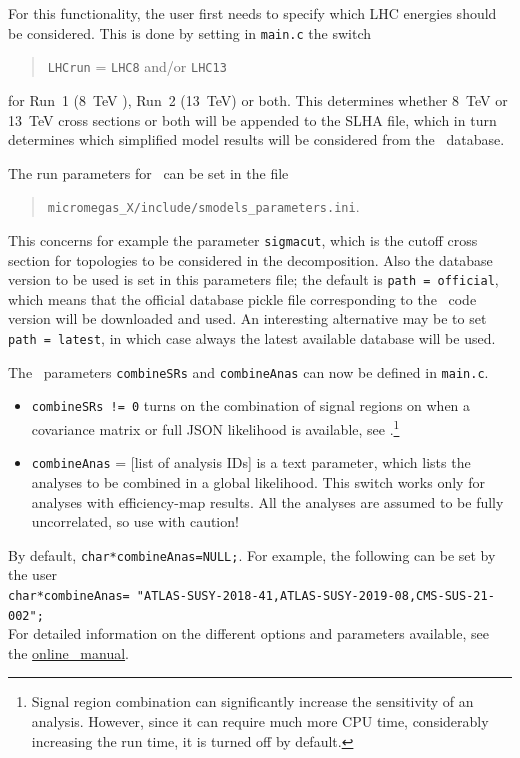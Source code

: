 \documentclass[12pt,a4paper]{article}
\begin{document}
For this functionality, the user first needs to specify which LHC energies  should be considered.
This is done by setting in {\tt main.c} the switch
\begin{quote}
    \verb|LHCrun| = \verb|LHC8| and/or \verb|LHC13| 
\end{quote}
for Run~1 (8~TeV ), Run~2 (13~TeV) or both. This determines whether 8~TeV or 13~TeV cross sections or both
will be appended to the SLHA file, which in turn determines which
simplified model results will be considered from the \smodels\
database.
 
The run parameters for \smodels\ can be set in the file
\begin{quote}
    \verb|micromegas_X/include/smodels_parameters.ini|.
 \end{quote}
This concerns for example the parameter \verb|sigmacut|, 
which is the cutoff cross section for topologies to be considered in the decomposition. 
Also the database version to be used is set in this parameters file; the default is {\tt path = official}, which means that the official database pickle file corresponding to the \smodels\ code version will be downloaded and used. An interesting alternative may be to set {\tt path = latest}, in which case always the latest available database will be used. 

The \smodels\ parameters {\tt combineSRs} and 
{\tt combineAnas} can now be defined in {\tt main.c}.\\
\begin{itemize}
	\item \verb|combineSRs != 0|  turns on the combination of signal regions on when a covariance matrix or full JSON likelihood is available, see \cite{Ambrogi:2018ujg,Alguero:2020grj}.\footnote{Signal region combination can significantly increase the sensitivity of an analysis. However, since it can require much more CPU time, considerably increasing the run time, it is turned off by default.}
	\item \verb|combineAnas| = [list of analysis IDs]  is a text parameter, which lists the analyses to be combined in a global likelihood. This switch works only for analyses with efficiency-map results. All the analyses are assumed to be fully uncorrelated, so use with caution!
\end{itemize}	
By default,  \verb|char*combineAnas=NULL;|. For example, the following can be set by the user \\
\verb|char*combineAnas= "ATLAS-SUSY-2018-41,ATLAS-SUSY-2019-08,CMS-SUS-21-002";|\\ 
For detailed information on the different options and parameters available, see the 
\href{https://smodels.readthedocs.io/en/latest/RunningSModelS.html}{online \smodels\ manual}.
\end{document}

